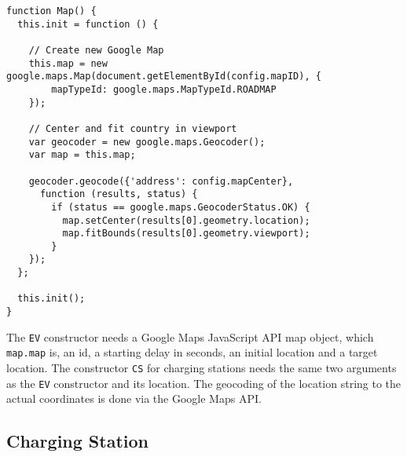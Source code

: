 \begin{verbatim}
function Map() {
  this.init = function () {

    // Create new Google Map
    this.map = new google.maps.Map(document.getElementById(config.mapID), {
        mapTypeId: google.maps.MapTypeId.ROADMAP
    });

    // Center and fit country in viewport
    var geocoder = new google.maps.Geocoder();
    var map = this.map;

    geocoder.geocode({'address': config.mapCenter},
      function (results, status) {
        if (status == google.maps.GeocoderStatus.OK) {
          map.setCenter(results[0].geometry.location);
          map.fitBounds(results[0].geometry.viewport);
        }
    });
  };

  this.init();
}
\end{verbatim}

The \texttt{EV} constructor needs a Google Maps JavaScript API map object, which \texttt{map.map} is, an id, a starting delay in seconds, an initial location and a target location. The constructor \texttt{CS} for charging stations needs the same two arguments as the \texttt{EV} constructor and its location. The geocoding of the location string to the actual coordinates is done via the Google Maps API.



\newpage
\subsection{Charging Station}

